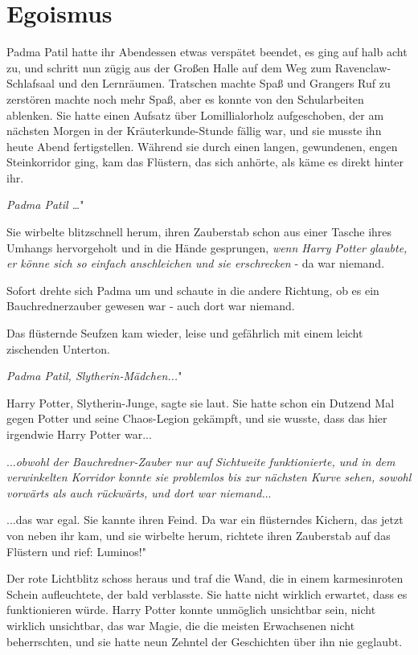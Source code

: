 \chapter{Egoismus}

Padma Patil hatte ihr Abendessen etwas verspätet beendet, es ging auf halb acht
zu, und schritt nun zügig aus der Großen Halle auf dem Weg zum
Ravenclaw-Schlafsaal und den Lernräumen. Tratschen machte Spaß und Grangers Ruf
zu zerstören machte noch mehr Spaß, aber es konnte von den Schularbeiten
ablenken. Sie hatte einen Aufsatz über Lomillialorholz aufgeschoben, der am
nächsten Morgen in der Kräuterkunde-Stunde fällig war, und sie musste ihn heute
Abend fertigstellen. Während sie durch einen langen, gewundenen, engen
Steinkorridor ging, kam das Flüstern, das sich anhörte, als käme es direkt
hinter ihr.

\glqq \emph{Padma Patil …}"

Sie wirbelte blitzschnell herum, ihren Zauberstab schon aus einer Tasche ihres
Umhangs hervorgeholt und in die Hände gesprungen,\emph{ wenn Harry Potter
glaubte, er könne sich so einfach anschleichen und sie erschrecken} - da war
niemand.

Sofort drehte sich Padma um und schaute in die andere Richtung, ob es ein
Bauchrednerzauber gewesen war - auch dort war niemand.

Das flüsternde Seufzen kam wieder, leise und gefährlich mit einem leicht
zischenden Unterton.

\glqq \emph{Padma Patil, Slytherin-Mädchen...}"

\glqq Harry Potter, Slytherin-Junge\grqq{}, sagte sie laut. Sie hatte schon ein
Dutzend Mal gegen Potter und seine Chaos-Legion gekämpft, und sie wusste, dass
das hier irgendwie Harry Potter war...

...\emph{obwohl der Bauchredner-Zauber nur auf Sichtweite funktionierte, und in
dem verwinkelten Korridor konnte sie problemlos bis zur nächsten Kurve sehen,
sowohl vorwärts als auch rückwärts, und dort war niemand.}..

...das war egal. Sie kannte ihren Feind. Da war ein flüsterndes Kichern, das
jetzt von neben ihr kam, und sie wirbelte herum, richtete ihren Zauberstab auf
das Flüstern und rief: \glqq Luminos!"

Der rote Lichtblitz schoss heraus und traf die Wand, die in einem karmesinroten
Schein aufleuchtete, der bald verblasste. Sie hatte nicht wirklich erwartet,
dass es funktionieren würde. Harry Potter konnte unmöglich unsichtbar sein,
nicht wirklich unsichtbar, das war Magie, die die meisten Erwachsenen nicht
beherrschten, und sie hatte neun Zehntel der Geschichten über ihn nie geglaubt.

